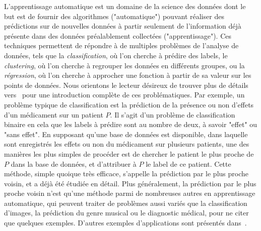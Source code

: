 L'apprentissage automatique est un domaine de la science des donn\'ees dont le but est de fournir des algorithmes ("automatique") pouvant r\'ealiser des
pr\'edictions sur de nouvelles donn\'ees \`a partir seulement de  l'information d\'ej\`a pr\'esente dans des donn\'ees pr\'ealablement collect\'ees ("apprentissage").
Ces techniques permettent de r\'epondre \`a de multiples probl\`emes de l'analyse de donn\'ees, tels que la {\em classification}, o\`u l'on cherche
\`a pr\'edire des labels, le {\em clustering}, o\`u l'on cherche \`a regrouper les donn\'ees en diff\'erents groupes, ou la {\em r\'egression}, o\`u l'on
cherche \`a approcher une fonction \`a partir de sa valeur sur les points de donn\'ees. Nous orientons le lecteur d\'esireux de trouver plus de d\'etails
vers~\cite{Friedman01} pour une introduction compl\`ete de ces probl\'ematiques.
Par exemple, un probl\`eme typique de classification est la pr\'ediction de la pr\'esence ou non d'effets d'un m\'edicament sur un patient $P$. Il s'agit 
d'un probl\`eme de classification binaire en cela que les labels \`a pr\'edire sont au nombre de deux, \`a savoir "effet" ou "sans effet".
En supposant qu'une base de donn\'ees est disponible, dans laquelle sont enregistr\'es les effets ou non du m\'edicament sur plusieurs patients, 
une des mani\`eres les plus simples de proc\'eder est de chercher le patient le plus proche de $P$ dans la base de donn\'ees, et d'attribuer
\`a $P$ le label de ce patient. Cette m\'ethode, simple quoique tr\`es efficace, s'appelle la pr\'ediction par le plus proche voisin,
et a d\'ej\`a \'et\'e \'etudi\'ee en d\'etail. Plus g\'en\'eralement, la pr\'ediction par le plus proche voisin n'est qu'une m\'ethode parmi de nombreuses autres
en apprentissage automatique, qui peuvent traiter de probl\`emes aussi vari\'es que la classification d'images, la pr\'ediction du genre musical
ou le diagnostic m\'edical, pour ne citer que quelques exemples.
D'autres exemples d'applications sont pr\'esent\'es dans~\cite{Friedman01}. %
 



